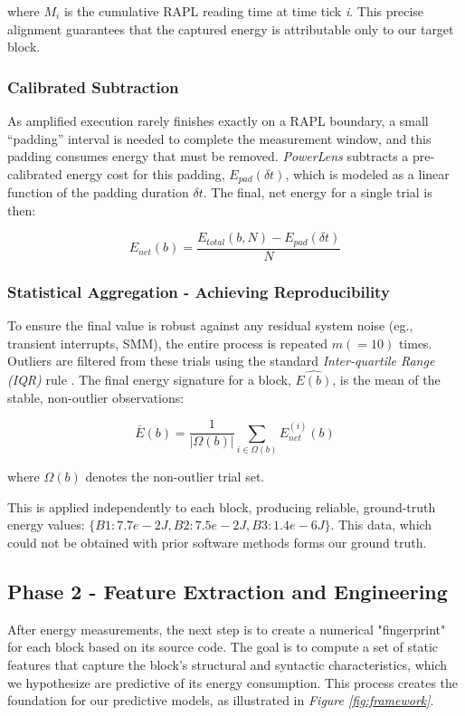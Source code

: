 where \( M_i \) is the cumulative RAPL reading time at time tick \textit{i}. This precise alignment guarantees that the captured energy is attributable only to our target block. 


\subsubsection{Calibrated Subtraction}

As amplified execution rarely finishes exactly on a RAPL boundary, a small “padding” interval is needed to complete the measurement window, and this padding consumes energy that must be removed. \textit{PowerLens} subtracts a pre-calibrated energy cost for this padding, \( E_{pad}(\delta t) \), which is modeled as a linear function of the padding duration \( \delta t \). The final, net energy for a single trial is then:

\[ E_{net}(b) = \frac{E_{total}(b,N) - E_{pad}(\delta t)}{N} \]



\subsubsection{Statistical Aggregation - Achieving Reproducibility}

To ensure the final value is robust against any residual system noise (eg., transient interrupts, SMM), the entire process is repeated \(m (=10)\) times. Outliers are filtered from these trials using the standard \textit{Inter-quartile Range (IQR)} rule \cite{alma9995263502466}. The final energy signature for a block, \( \hat{E(b)} \), is  the mean of the stable, non-outlier observations:

\[ \bar{E}(b) = \frac{1}{|\Omega(b)|} \sum_{i \in \Omega(b)} E_{net}^{(i)}(b) \]

where \(\Omega(b)\) denotes the non-outlier trial set. 

This is applied independently to each block, producing reliable, ground-truth energy values: \(\{B1: 7.7e-2 J, B2: 7.5e-2 J, B3: 1.4e-6 J\}\). This data, which could not be obtained with prior software methods forms our ground truth.

\subsection{Phase 2 - Feature Extraction and Engineering}

After energy measurements, the next step is to create a numerical "fingerprint" for each block based on its source code\cite{10.1145/3639475.3640110}. The goal is to compute a set of static features that capture the block's structural and syntactic characteristics, which we hypothesize are predictive of its energy consumption. This process creates the foundation for our predictive models, as illustrated in \textit{Figure \ref{fig:framework}}.

